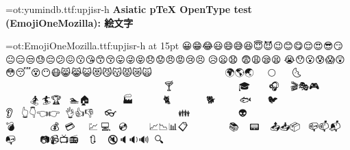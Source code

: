 \parindent0pt
\font\hed=ot:yumindb.ttf:upjisr-h\hed
\bf Asiatic {p\TeX} OpenType test (EmojiOneMozilla): 絵文字\par
\vskip20pt
\font\fnt=ot:EmojiOneMozilla.ttf:upjisr-h at 15pt\fnt
😀😁😂😃😄😅😆😇😈😉😊😋😌😍😎😏😐😑😒😓😔😕😖😗😘😙😚😛😜😝😞😟😠😡😢😣😤😥😦😧
😨😩😪😫😬😭😯😮😰😱😲😳😴😵😶😷😸😹😺😻😼😽😾😿🙀🙁🙂🙅🙆🙇🙈🙉🙊🙋🙌🙍🙎🙏🌀🌁
🌂🌃🌄🌅🌆🌇🌈🌉🌊🌋🌌🌍🌎🌏🌐🌑🌒🌓🌔🌕🌖🌗🌘🌙🌚🌛🌜🌝🌞🌟🌠🌰🌱🌲🌳🌴🌵🌷🌸🌹
🌺🌻🌼🌽🌾🌿🍀🍁🍂🍃🍄🍅🍆🍇🍈🍉🍊🍋🍌🍍🍎🍏🍐🍑🍒🍓🍔🍕🍖🍗🍘🍙🍚🍛🍜🍝🍞🍟🍠🍡
🍢🍣🍤🍥🍦🍧🍨🍩🍪🍫🍬🍭🍮🍯🍰🍱🍲🍳🍴🍵🍶🍷🍸🍹🍺🍻🍼🎀🎁🎂🎃🎄🎅🎆🎇🎈🎉🎊🎋🎌
🎍🎎🎏🎐🎑🎒🎓🎠🎡🎢🎣🎤🎥🎦🎧🎨🎩🎪🎫🎬🎭🎮🎯🎰🎱🎲🎳🎴🎵🎶🎷🎸🎹🎺🎻🎼🎽🎾🎿🏀
🏁🏂🏃🏄🏆🏇🏈🏉🏊🏠🏡🏢🏣🏤🏥🏦🏧🏨🏩🏪🏫🏬🏭🏮🏯🏰🐀🐁🐂🐃🐄🐅🐆🐇🐈🐉🐊🐋🐌🐍
🐎🐏🐐🐑🐒🐓🐔🐕🐖🐗🐘🐙🐚🐛🐜🐝🐞🐟🐠🐡🐢🐣🐤🐥🐦🐧🐨🐩🐪🐫🐬🐭🐮🐯🐰🐱🐲🐳🐴🐵
🐶🐷🐸🐹🐺🐻🐼🐽🐾👀👂👃👄👅👆👇👈👉👊👋👌👍👎👏👐👑👒👓👔👕👖👗👘👙👚👛👜👝👞👟
👠👡👢👣👤👥👦👧👨👩👪👫👬👭👮👯👰👱👲👳👴👵👶👷👸👹👺👻👼👽👾👿💀💁💂💃💄💅💆💇
💈💉💊💋💌💍💎💏💐💑💒💓💔💕💖💗💘💙💚💛💜💝💞💟💠💡💢💣💤💥💦💧💨💩💪💫💬💭💮💯
💰💱💲💳💴💵💶💷💸💹💺💻💼💽💾💿📀📁📂📃📄📅📆📇📈📉📊📋📌📍📎📏📐📑📒📓📔📕📖📗
📘📙📚📛📜📝📞📟📠📡📢📣📤📥📦📧📨📩📪📫📬📭📮📯📰📱📲📳📴📵📶📷📹📺📻📼🔀🔁🔂🔃
🔄🔅🔆🔇🔈🔉🔊🔋🔌🔍🔎🔏
\bye
